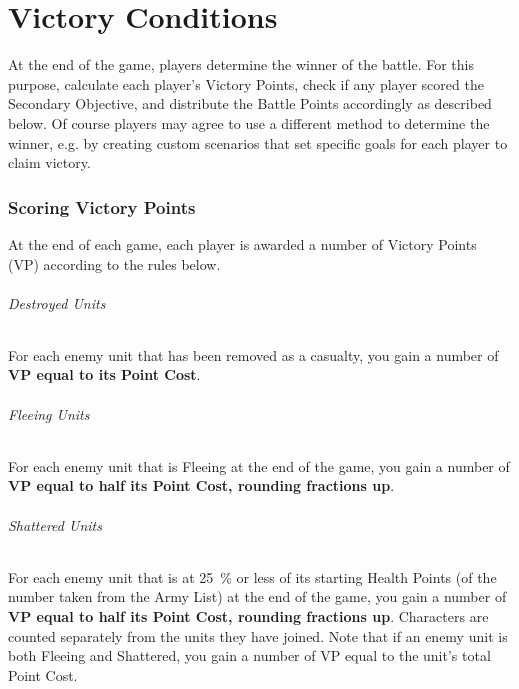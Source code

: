 
\part{Victory Conditions}
\label{victory_conditions}

At the end of the game, players determine the winner of the battle. For this purpose, calculate each player's Victory Points, check if any player scored the Secondary Objective, and distribute the Battle Points accordingly as described below. Of course players may agree to use a different method to determine the winner, e.g. by creating custom scenarios that set specific goals for each player to claim victory.

\RBbmc

\section{Scoring Victory Points}
\label{scoring_victory_points}

At the end of each game, each player is awarded a number of Victory Points (VP) according to the rules below.

\paragraph{Destroyed Units}

For each enemy unit that has been removed as a casualty, you gain a number of \textbf{VP equal to its Point Cost}.

\paragraph{Fleeing Units}

For each enemy unit that is Fleeing at the end of the game, you gain a number of \textbf{VP equal to half its Point Cost, rounding fractions up}.

\paragraph{Shattered Units}

For each enemy unit that is at \SI{25}{\percent} or less of its starting Health Points (of the number taken from the Army List) at the end of the game, you gain a number of \textbf{VP equal to half its Point Cost, rounding fractions up}. Characters are counted separately from the units they have joined. Note that if an enemy unit is both Fleeing and Shattered, you gain a number of VP equal to the unit's total Point Cost.

